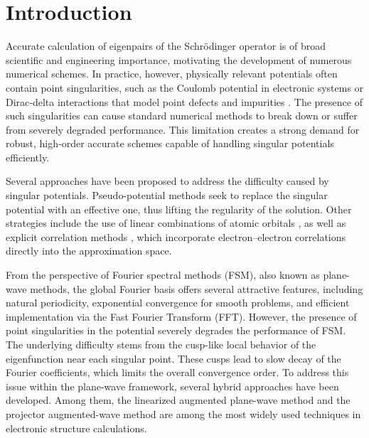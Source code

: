 \documentclass{sn-jnl}%
\numberwithin{equation}{section}
\theoremstyle{thmstyleone}%
\theoremstyle{thmstyletwo}%
\theoremstyle{thmstylethree}%
\begin{document}



\maketitle

\section{Introduction}
Accurate calculation of eigenpairs of the Schr\"odinger operator is of broad scientific and engineering importance, motivating the development of numerous numerical schemes. In practice, however, physically relevant potentials often contain point singularities, such as the Coulomb potential in electronic systems or Dirac‑delta interactions that model point defects and impurities \cite{dean2021delta,holmer2007delta}. The presence of such singularities can cause standard numerical methods to break down or suffer from severely degraded performance. This limitation creates a strong demand for robust, high‑order accurate schemes capable of handling singular potentials efficiently.

Several approaches have been proposed to address the difficulty caused by singular potentials. 
Pseudo-potential methods \cite{troullier1991PP,kresse1994PP,ramer1999PP,hamann2013PP} seek to replace the singular potential with an effective one, thus lifting the regularity of the solution. 
Other strategies include the use of linear combinations of atomic orbitals \cite{bachmayr2014LCAO,scholz2017LCAO,li2017invpow}, as well as explicit correlation methods \cite{shiozaki2009EC,ten2012EC,kong2012EC,li2012EC,hattig2012EC}, which incorporate electron–electron correlations directly into the approximation space.

From the perspective of Fourier spectral methods (FSM), also known as plane-wave methods, the global Fourier basis offers several attractive features, including natural periodicity, exponential convergence for smooth problems, and efficient implementation via the Fast Fourier Transform (FFT). 
However, the presence of point singularities in the potential severely degrades the performance of FSM. 
The underlying difficulty stems from the cusp-like local behavior of the eigenfunction near each singular point. 
These cusps lead to slow decay of the Fourier coefficients, which limits the overall convergence order. To address this issue within the plane-wave framework, several hybrid approaches have been developed. 
Among them, the linearized augmented plane-wave method \cite{madsen2001LAPW,blugel2006LAPW} and the projector augmented-wave method \cite{blochl1994PAW,kresse1999PAW} are among the most widely used techniques in electronic structure calculations.
\end{document}
